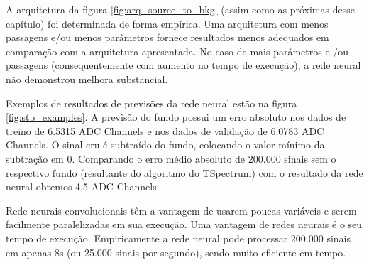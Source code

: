 \documentclass[a4paper,12pt,oneside]{book}
\begin{document}

\par A arquitetura da figura \ref{fig:arq_source_to_bkg} (assim como as próximas desse capítulo) foi determinada de forma empírica. Uma arquitetura com menos passagens e/ou menos parâmetros fornece resultados menos adequados em comparação com a arquitetura apresentada. No caso de mais parâmetros e /ou passagens (consequentemente com aumento no tempo de execução), a rede neural não demonstrou melhora substancial.

\par Exemplos de resultados de previsões da rede neural estão na figura \ref{fig:stb_examples}. A previsão do fundo possui um erro absoluto nos dados de treino de 6.5315 ADC Channels e nos dados de validação de 6.0783 ADC Channels. O sinal cru é subtraído do fundo, colocando o valor mínimo da subtração em 0. Comparando o erro médio absoluto de 200.000 sinais sem o respectivo fundo (resultante do algoritmo do TSpectrum) com o resultado da rede neural obtemos 4.5 ADC Channels.

\par Rede neurais convolucionais têm a vantagem de usarem poucas variáveis e serem facilmente paralelizadas em sua execução\cite{mlbook}. Uma vantagem de redes neurais é o seu tempo de execução. Empiricamente a rede neural pode processar 200.000 sinais em apenas 8s (ou 25.000 sinais por segundo), sendo muito eficiente em tempo.
\end{document}
